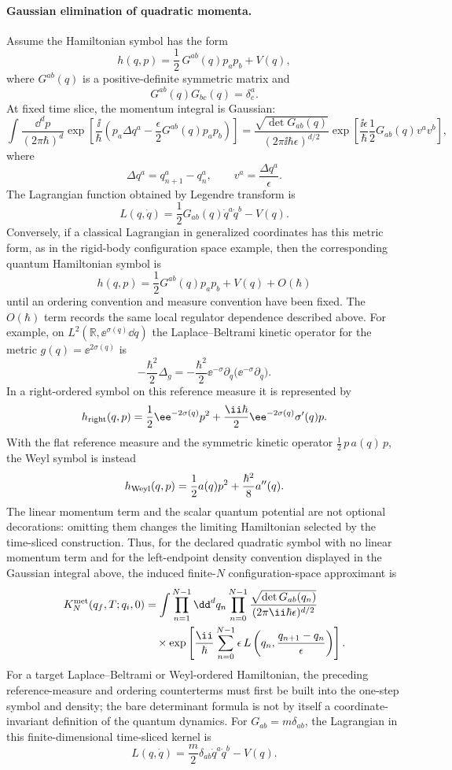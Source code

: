 \paragraph{Gaussian elimination of quadratic momenta.}
Assume the Hamiltonian symbol has the form
\[
  h(q,p)
  =
  \frac12\,G^{ab}(q)p_ap_b+V(q),
\]
where \(G^{ab}(q)\) is a positive-definite symmetric matrix and
\[
  G^{ab}(q)G_{bc}(q)=\delta^a_c.
\]
At fixed time slice, the momentum integral is Gaussian:
\[
  \int\frac{\dd^dp}{(2\pi\hbar)^d}
  \exp\left[
    \frac{\ii}{\hbar}
    \left(
      p_a\Delta q^a
      -\frac{\epsilon}{2}G^{ab}(q)p_ap_b
    \right)
  \right]
  =
  \frac{\sqrt{\det G_{ab}(q)}}{(2\pi\ii\hbar\epsilon)^{d/2}}
  \exp\left[
    \frac{\ii\epsilon}{\hbar}
    \frac12G_{ab}(q)v^av^b
  \right],
\]
where
\[
  \Delta q^a=q_{n+1}^a-q_n^a,
  \qquad
  v^a=\frac{\Delta q^a}{\epsilon}.
\]
The Lagrangian function obtained by Legendre transform is
\[
  L(q,\dot q)
  =
  \frac12G_{ab}(q)\dot q^a\dot q^b-V(q).
\]
Conversely, if a classical Lagrangian in generalized coordinates has this
metric form, as in the rigid-body configuration space example, then the
corresponding quantum Hamiltonian symbol is
\[
h(q,p)=\frac12G^{ab}(q)p_ap_b+V(q)+O(\hbar)
\]
until an ordering convention and measure convention have been fixed.  The
\(O(\hbar)\) term records the same local regulator dependence described
above.  For example, on \(L^2(\mathbb R,\ee^{\sigma(q)}\dd q)\) the
Laplace--Beltrami kinetic operator for the metric
\(g(q)=\ee^{2\sigma(q)}\) is
\[
  -\frac{\hbar^2}{2}\Delta_g
  =
  -\frac{\hbar^2}{2}\ee^{-\sigma}\partial_q
  \bigl(\ee^{-\sigma}\partial_q\bigr).
\]
In a right-ordered symbol on this reference measure it is represented by
\[
  h_{\rm right}(q,p)
  =
  \frac12\ee^{-2\sigma(q)}p^2
  +
  \frac{\ii\hbar}{2}\ee^{-2\sigma(q)}\sigma'(q)p .
\]
With the flat reference measure and the symmetric kinetic operator
\(\frac12\,p\,a(q)\,p\), the Weyl symbol is instead
\[
  h_{\rm Weyl}(q,p)
  =
  \frac12a(q)p^2+\frac{\hbar^2}{8}a''(q).
\]
The linear momentum term and the scalar quantum potential are not optional
decorations: omitting them changes the limiting Hamiltonian selected by the
time-sliced construction.  Thus, for the declared quadratic symbol with no
linear momentum term and for the left-endpoint density convention displayed in
the Gaussian integral above, the induced finite-\(N\) configuration-space
approximant is
\[
\begin{aligned}
  K_N^{\rm met}(q_f,T;q_i,0)
  &=
  \int\prod_{n=1}^{N-1}\dd^dq_n
  \prod_{n=0}^{N-1}
  \frac{\sqrt{\det G_{ab}(q_n)}}{(2\pi\ii\hbar\epsilon)^{d/2}}
  \\
  &\quad\times
  \exp\left[
    \frac{\ii}{\hbar}
    \sum_{n=0}^{N-1}
    \epsilon\,
    L\left(q_n,\frac{q_{n+1}-q_n}{\epsilon}\right)
  \right].
\end{aligned}
\]
For a target Laplace--Beltrami or Weyl-ordered Hamiltonian, the preceding
reference-measure and ordering counterterms must first be built into the
one-step symbol and density; the bare determinant formula is not by itself a
coordinate-invariant definition of the quantum dynamics.
For \(G_{ab}=m\delta_{ab}\), the Lagrangian in this finite-dimensional
time-sliced kernel is
\[
  L(q,\dot q)=\frac{m}{2}\delta_{ab}\dot q^a\dot q^b-V(q).
\]

